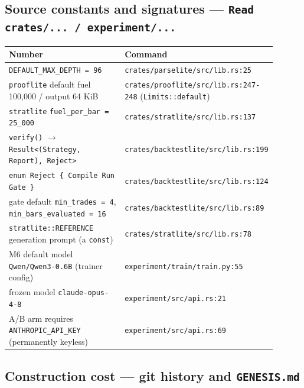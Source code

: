 \documentclass[11pt]{article}
\newcommand{\code}[1]{\texttt{#1}}
\begin{document}
\subsection*{Source constants and signatures --- \code{Read crates/... / experiment/...}}

\begingroup\small
\begin{longtable}{p{0.450\linewidth} p{0.450\linewidth}}
\toprule
\textbf{Number} & \textbf{Command} \\
\midrule\endhead
\code{DEFAULT\_MAX\_DEPTH = 96} & \code{crates/parselite/src/lib.rs:25} \\
\code{prooflite} default fuel 100,000 / output 64 KiB & \code{crates/prooflite/src/lib.rs:247-248} (\code{Limits::default}) \\
\code{stratlite} \code{fuel\_per\_bar = 25\_000} & \code{crates/stratlite/src/lib.rs:137} \\
\code{verify()} $\rightarrow$ \code{Result<(Strategy, Report), Reject>} & \code{crates/backtestlite/src/lib.rs:199} \\
\code{enum Reject \{ Compile \textbar{} Run \textbar{} Gate \}} & \code{crates/backtestlite/src/lib.rs:124} \\
gate default \code{min\_trades = 4}, \code{min\_bars\_evaluated = 16} & \code{crates/backtestlite/src/lib.rs:89} \\
\code{stratlite::REFERENCE} generation prompt (a \code{const}) & \code{crates/stratlite/src/lib.rs:78} \\
M6 default model \code{Qwen/Qwen3-0.6B} (trainer config) & \code{experiment/train/train.py:55} \\
frozen model \code{claude-opus-4-8} & \code{experiment/src/api.rs:21} \\
A/B arm requires \code{ANTHROPIC\_API\_KEY} (permanently keyless) & \code{experiment/src/api.rs:69} \\
\bottomrule
\end{longtable}\endgroup

\subsection*{Construction cost --- git history and \code{GENESIS.md}}
\end{document}
